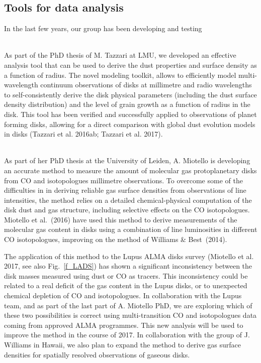 \documentclass[10pt,fleqn,twoside]{article}
\begin{document}
\subsection{Tools for data analysis}
\label{s_tools}

In the last few years, our group has been developing and testing

\vspace{1em}{\Tcol\bf Dust properties and surface density as a function of radius}\\
As part of the PhD thesis of M. Tazzari at LMU, we developed an effective analysis tool that can be used to derive the dust properties and surface density as a function of radius. The novel modeling toolkit, allows to efficiently model multi-wavelength continuum observations of disks at millimetre and radio wavelengths to self-consistently derive the disk physical parameters (including the dust surface density distribution) and the level of grain growth as a function of radius in the disk. This tool has been verified and successfully applied to observations of planet forming disks, allowing for a direct comparison with global dust evolution models in disks (Tazzari et al. 2016ab; Tazzari et al. 2017).  

\vspace{1em}{\Tcol\bf Disk gas masses from ALMA observations}\\
As part of her PhD thesis at the University of Leiden, A. Miotello is developing an accurate method to measure the amount of molecular gas protoplanetary disks from CO and isotopologues millimetre observations. To overcome some of the difficulties in in deriving reliable gas surface densities from observations of line intensities, the method relies on a detailed chemical-physical computation of the disk dust and gas structure, including selective effects on the CO isotopologues. Miotello et al.~(2016) have used this method to derive measurements of the molecular gas content in disks using a combination of line luminosities in different CO isotopologues, improving on the method of Williams \& Best~(2014).

The application of this method to the Lupus ALMA disks survey (Miotello et al. 2017, see also Fig.~\ref{f_LADS}) has shown a significant inconsistency between the disk masses measured using dust or CO as tracers. This inconsistency could be related to a real deficit of the gas content in the Lupus disks, or to unexpected chemical depletion of CO and isotopologues. In collaboration with the Lupus team, and as part of the last part of A. Miotello PhD, we are exploring which of these two possibilities is correct using multi-transition CO and isotopologues data coming from approved ALMA programmes. This new analysis will be used to improve the method in the course of 2017. In collaboration with the group of J. Williams in Hawaii, we also plan to expand the method to derive gas surface densities for spatially resolved observations of gaseous disks.
\end{document}
